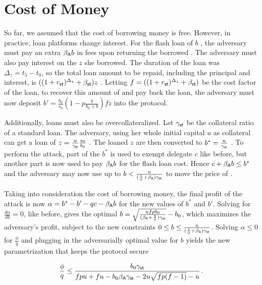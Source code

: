
\section{Cost of Money}\label{sec:cost-of-money}

So far, we assumed that the cost of borrowing money is free.
However, in practice, loan platforms change interest.
For the flash loan of $b$ \asset, the adversary must pay an extra
$\beta_{\textsf{A}} b$ \asset in fees upon returning the borrowed \asset.
The adversary must also pay interest on the $z$ \stasset she borrowed.
The duration of the loan was $\Delta_z = t_5 - t_0$, so the
total loan amount to be repaid, including the principal and interest, is
$((1 + r_{\textsf{st}})^{\Delta_z} + \beta_{\textsf{st}}) z$ \stasset.
Letting $f = ((1 + r_{\textsf{st}})^{\Delta_z} + \beta_{\textsf{st}})$ be the cost factor
of the loan, to recover this amount of \stasset and pay back the loan, the adversary must now
deposit $b' = \frac{b_0}{s_0}(1 - p\frac{b}{b_0 + b}) f z$ \asset
into the protocol.

Additionally, loans must also be overcollateralized.
Let $\gamma_{\textsf{st}}$ be the collateral ratio of a standard \stasset loan.
The adversary, using her whole initial capital $u$ as collateral can get a loan of
$z = \frac{u}{\gamma_{\textsf{st}}} \frac{s_0}{b_0}$ \stasset.
The loaned $z$ \stasset are then converted to $b^*=\frac{u}{\gamma_{\textsf{st}}}$ \asset.
To perform the attack, part of the $b^*$ \asset is used to exempt delegate $c$ like
before, but another part is now used to pay $\beta_{\textsf{A}} b$ for the flash loan cost.
Hence $c + \beta_{\textsf{A}} b \leq b^*$ and the adversary may now use up to
$b < \frac{u}{(\frac{1}{\phi} + \beta_{\textsf{A}}) \gamma_{\textsf{st}}}$ to move the price
of \stasset.


Taking into consideration the cost of borrowing money, the final profit of the attack is now
$\alpha = b^* - b' - qc - \beta_{\textsf{A}} b$ for the new values of $b^*$ and $b'$.
Solving for $\frac{d\alpha}{db} = 0$, like before, gives the optimal
$b = \sqrt{\frac{u f p b_0}{(\beta_{\textsf{A}} + \frac{q}{\phi})\gamma_{\textsf{st}}}} - b_0$,
which maximizes the adversary's profit, subject to the new constraints
$0 \leq b \leq \frac{u}{(\frac{1}{\phi} + \beta_{\textsf{A}}) \gamma_{\textsf{st}}}$.
Solving $\alpha \leq 0$ for $\frac{\phi}{q}$ and plugging in the adversarially optimal value for $b$
yields the new parametrization that keeps the protocol secure

\begin{gather*}
  \frac{\phi}{q} \leq \frac{b_0 \gamma_{\textsf{st}}}{f p u + f u - b_0 \beta_{\textsf{A}} \gamma_{\textsf{st}} - 2 u \sqrt{fp (f-1)} - u}\,.
\end{gather*}

